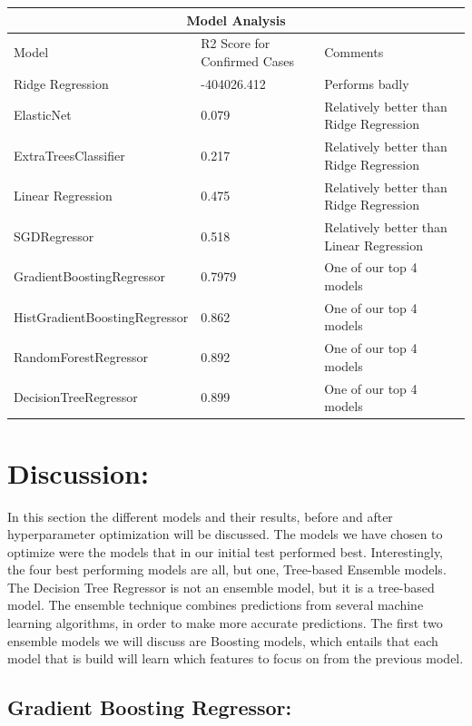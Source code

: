 \documentclass{article}
\begin{document}
\begin{tabular}{ |p{5cm}||p{5cm}||p{5cm}|  }
 \hline
 \multicolumn{3}{|c|}{Model Analysis} \\
 \hline
 \hline
Model   & R2 Score for Confirmed Cases & Comments\\
 \hline
 \hline
 Ridge Regression   & -404026.412 & Performs badly  \\
   \hline
 ElasticNet  & 0.079 & Relatively better than Ridge Regression \\
  \hline
   ExtraTreesClassifier & 0.217 & Relatively better than Ridge Regression \\
 \hline
  Linear Regression   & 0.475 & Relatively better than Ridge Regression \\
  \hline
SGDRegressor   & 0.518 & Relatively better than Linear Regression \\
  \hline
  GradientBoostingRegressor & 0.7979 &  One of our top 4 models \\
   \hline
  HistGradientBoostingRegressor & 0.862 &  One of our top 4 models \\
  \hline
  RandomForestRegressor & 0.892 &  One of our top 4 models \\
  \hline
   DecisionTreeRegressor & 0.899&  One of our top 4 models \\
  \hline
\end{tabular}

\section{Discussion:}

In this section the different models and their results, before and after hyperparameter optimization will be discussed. The models we have chosen to optimize were the models that in our initial test performed best. Interestingly, the four best performing models are all, but one, Tree-based Ensemble models. The Decision Tree Regressor is not an ensemble model, but it is a tree-based model. The ensemble technique combines predictions from several machine learning algorithms, in order to make more accurate predictions. 
The first two ensemble models we will discuss are Boosting models, which entails that each model that is build will learn which features to focus on from the previous model. 

\subsection{Gradient Boosting Regressor:}
\end{document}
